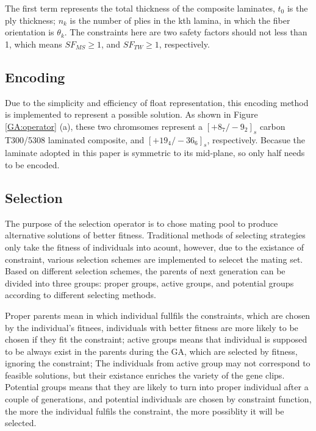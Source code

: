 The first term represents the total thickness of the composite laminates, $t_0$
is the ply thickness; $n_k$ is the number of plies in the kth lamina, in which
the fiber orientation is $\theta_k$. The constraints here are two safety
factors should not less than 1, which means  $SF_{MS} \geq 1$, and $SF_{TW} \geq
1$, respectively.

\subsection{Encoding}
Due to the simplicity and efficiency of float representation, this encoding
method is implemented to represent a possible solution. As shown in Figure \ref{GA:operator}
 (a), these two chromsomes represent a $[+8_{7}/-9_{2}]_s$
carbon T300/5308 laminated composite, and $[+19_{4}/-36_{6}]_s$, respectively.
Becasue the laminate adopted in this paper is symmetric to its mid-plane, so
only half needs to be encoded.

\afterpage{

\clearpage
}

\subsection{Selection}
The purpose of the selection operator is to chose mating pool to produce
alternative solutions of better fitness. Traditional methods of selecting
strategies only take the fitness of individuals into acount, however, due to 
the existance of constraint, various selection schemes are implemented to
selecet the mating set. Based on different selection schemes, the parents of
next generation can be divided into  three groups: proper groups, active groups,
and potential groups according to different selecting methods. 

Proper parents mean in which individual fullfils the constraints, which are
chosen by the individual's fitnees, individuals with better fitness are more
likely to be chosen if they fit the constraint; active groups means that
individual is supposed to be always exist in the parents during the GA, which
are selected by fitness, ignoring the constraint; The individuals from active
group may not correspond to feasible solutions, but their existance enriches the
variety of the gene clips.  Potential groups means that they are likely to turn
into proper individual after a couple of generations, and potential individuals
are chosen by constraint function, the more the individual fulfils the
constraint, the more possiblity it will be selected.

